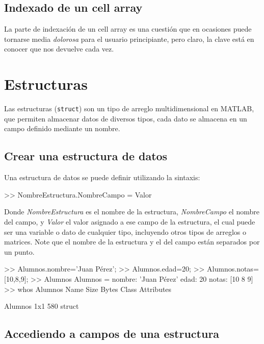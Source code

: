 \subsection{Indexado de un cell array}\label{indexado-de-un-cell-array}

La parte de indexación de un cell array es una cuestión que en ocasiones
puede tornarse media \emph{dolorosa} para el usuario principiante, pero
claro, la clave está en conocer que nos devuelve cada vez.

\section{Estructuras}\label{estructuras}

Las estructuras (\texttt{struct}) son un tipo de arreglo
multidimensional en MATLAB, que permiten almacenar datos de diversos
tipos, cada dato se almacena en un campo definido mediante un nombre.

\subsection{Crear una estructura de datos}\label{crear-una-estructura-de-datos}

Una estructura de datos se puede definir utilizando la sintaxis:

\begin{matlab}
>> NombreEstructura.NombreCampo = Valor
\end{matlab}

Donde \emph{NombreEstructura} es el nombre de la estructura,
\emph{NombreCampo} el nombre del campo, y \emph{Valor} el valor asignado
a ese campo de la estructura, el cual puede ser una variable o dato de
cualquier tipo, incluyendo otros tipos de arreglos o matrices. Note que
el nombre de la estructura y el del campo están separados por un punto.

\begin{matlab}
>> Alumnos.nombre='Juan Pérez';
>> Alumnos.edad=20;
>> Alumnos.notas=[10,8,9];
>> Alumnos
Alumnos = 
    nombre: 'Juan Pérez'
      edad: 20
     notas: [10 8 9]
>> whos Alumnos
  Name         Size            Bytes  Class     Attributes

  Alumnos      1x1               580  struct      
\end{matlab}

\subsection{Accediendo a campos de una estructura}\label{accediendo-a-campos-de-una-estructura}

